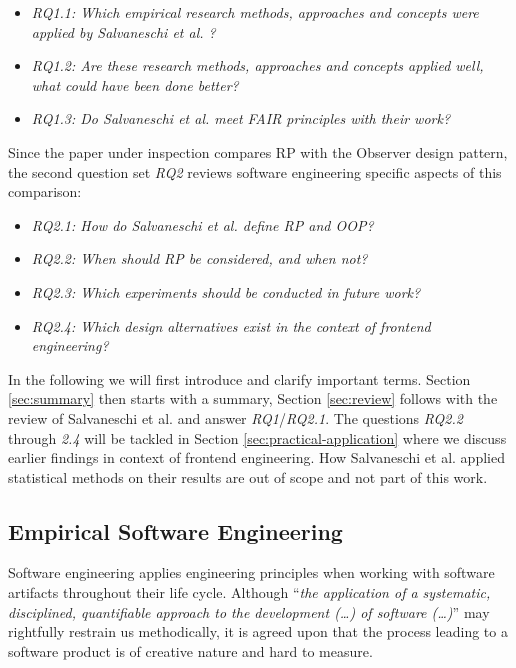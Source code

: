 \documentclass[12pt,a4paper]{article}
\begin{document}
\begin{itemize}
	\item \emph{RQ1.1: Which empirical research methods, approaches and concepts were applied by Salvaneschi et al. \cite{7827078}?}
	\item \emph{RQ1.2: Are these research methods, approaches and concepts applied well, what could have been done better?}
	\item \emph{RQ1.3: Do Salvaneschi et al. \cite{7827078} meet FAIR principles \cite{2019arXiv190805986H} \cite{wilkinson:2016} with their work?}
\end{itemize}

Since the paper under inspection compares RP with the Observer design pattern, the second question set \emph{RQ2} reviews software engineering specific aspects of this comparison:

\begin{itemize}
	\item \emph{RQ2.1: How do Salvaneschi et al. \cite{7827078} define RP and OOP?}
	\item \emph{RQ2.2: When should RP be considered, and when not?}
	\item \emph{RQ2.3: Which experiments should be conducted in future work?}
	\item \emph{RQ2.4: Which design alternatives exist in the context of frontend engineering?}
\end{itemize}

In the following we will first introduce and clarify important terms. Section \ref{sec:summary} then starts with a summary, Section \ref{sec:review} follows with the review of Salvaneschi et al. \cite{7827078} and answer \emph{RQ1}/\emph{RQ2.1}. The questions \emph{RQ2.2} through \emph{2.4} will be tackled in Section \ref{sec:practical-application} where we discuss earlier findings in context of frontend engineering. How Salvaneschi et al. applied statistical methods on their results are out of scope and not part of this work.

\subsection{Empirical Software Engineering}

Software engineering applies engineering principles when working with software artifacts \cite{159342} throughout their life cycle. Although ``\emph{the application of a systematic, disciplined, quantifiable approach to the development (\dots) of software (\dots)}'' \cite{159342} may rightfully restrain us methodically, it is agreed upon that the process leading to a software product is of creative nature \cite{8051350} and hard to measure.
\end{document}
